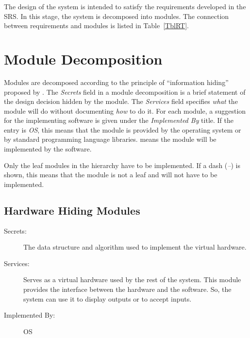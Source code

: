 \documentclass[12pt, titlepage]{article}
\begin{document}
The design of the system is intended to satisfy the requirements developed in
the SRS. In this stage, the system is decomposed into modules. The connection
between requirements and modules is listed in Table~\ref{TblRT}.


\section{Module Decomposition} \label{SecMD}

Modules are decomposed according to the principle of ``information hiding''
proposed by \citet{ParnasEtAl1984}. The \emph{Secrets} field in a module
decomposition is a brief statement of the design decision hidden by the
module. The \emph{Services} field specifies \emph{what} the module will do
without documenting \emph{how} to do it. For each module, a suggestion for the
implementing software is given under the \emph{Implemented By} title. If the
entry is \emph{OS}, this means that the module is provided by the operating
system or by standard programming language libraries.  \emph{\progname{}} means the
module will be implemented by the \progname{} software.

Only the leaf modules in the hierarchy have to be implemented. If a dash
(\emph{--}) is shown, this means that the module is not a leaf and will not have
to be implemented.

\subsection{Hardware Hiding Modules}

\begin{description}
\item[Secrets:]The data structure and algorithm used to implement the virtual
  hardware.
\item[Services:]Serves as a virtual hardware used by the rest of the
  system. This module provides the interface between the hardware and the
  software. So, the system can use it to display outputs or to accept inputs.
\item[Implemented By:] OS
\end{description}
\end{document}
